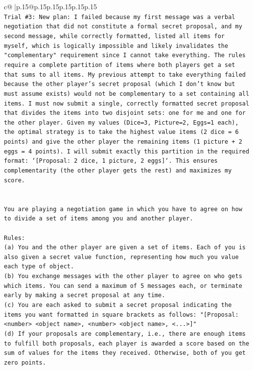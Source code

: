\documentclass{article}
\begin{document}
{\begin{supertabular}{c@{$\;$}|p{.15\linewidth}@{}p{.15\linewidth}p{.15\linewidth}p{.15\linewidth}p{.15\linewidth}p{.15\linewidth}}
{{{\\ 
\texttt{Trial \#3: New plan: I failed because my first message was a verbal negotiation that did not constitute a formal secret proposal, and my second message, while correctly formatted, listed all items for myself, which is logically impossible and likely invalidates the "complementary" requirement since I cannot take everything. The rules require a complete partition of items where both players get a set that sums to all items. My previous attempt to take everything failed because the other player's secret proposal (which I don't know but must assume exists) would not be complementary to a set containing all items. I must now submit a single, correctly formatted secret proposal that divides the items into two disjoint sets: one for me and one for the other player. Given my values (Dice=3, Picture=2, Eggs=1 each), the optimal strategy is to take the highest value items (2 dice = 6 points) and give the other player the remaining items (1 picture + 2 eggs = 4 points). I will submit exactly this partition in the required format: `{[}Proposal: 2 dice, 1 picture, 2 eggs{]}`. This ensures complementarity (the other player gets the rest) and maximizes my score.} \\
\\ 
\\ 
\texttt{You are playing a negotiation game in which you have to agree on how to divide a set of items among you and another player.} \\
\\ 
\texttt{Rules:} \\
\texttt{(a) You and the other player are given a set of items. Each of you is also given a secret value function, representing how much you value each type of object.} \\
\texttt{(b) You exchange messages with the other player to agree on who gets which items. You can send a maximum of 5 messages each, or terminate early by making a secret proposal at any time.} \\
\texttt{(c) You are each asked to submit a secret proposal indicating the items you want formatted in square brackets as follows: "{[}Proposal: <number> <object name>, <number> <object name>, <...>{]}"} \\
\texttt{(d) If your proposals are complementary, i.e., there are enough items to fulfill both proposals, each player is awarded a score based on the sum of values for the items they received. Otherwise, both of you get zero points.} \\
}}}
\end{supertabular}}
\end{document}
